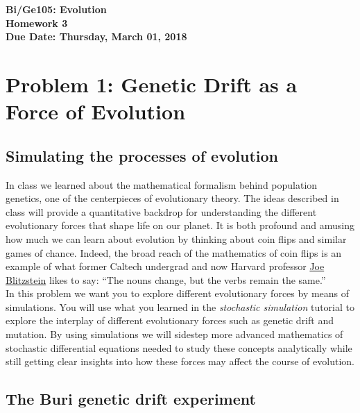 \documentclass[12pt]{article}    %
\begin{document}
\relax


\begin{center}
{\bf\Large Bi/Ge105: Evolution}\\
{\bf\Large Homework 3}\\
{\bf\Large Due Date: Thursday, March 01, 2018}\\
\end{center}

\section{Problem 1: Genetic Drift as a Force of Evolution}
\subsection{Simulating the  processes of evolution}

In class we learned about the mathematical formalism behind population
genetics, one of the centerpieces of evolutionary theory. The ideas described in
class will provide a quantitative backdrop for understanding the different
evolutionary forces that shape life on our planet. It is both profound and
amusing how much we can learn about evolution by thinking about coin flips and
similar games of chance. Indeed, the broad reach of the mathematics of coin
flips is an example of what former Caltech undergrad and now Harvard professor
\href{http://www.people.fas.harvard.edu/~blitz/Site/Home.html}{Joe Blitzstein}
likes to say: ``The nouns change, but the verbs remain the same.'' \\

In this  problem we want you to explore different evolutionary forces by means
of simulations. You will use what you learned in the \textit{stochastic
simulation} tutorial to explore the interplay of different evolutionary forces
such as genetic drift and mutation. By using simulations we will sidestep more
advanced mathematics of stochastic differential equations  needed to study these
concepts analytically while still getting clear insights into how these forces
may affect the course of evolution.

\subsection{The Buri genetic drift experiment}
\end{document}
